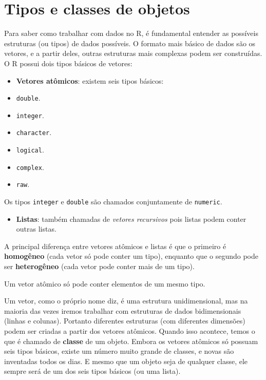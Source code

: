 \documentclass[10pt,a4paper]{book}
\providecommand{\tightlist}{%
  \setlength{\itemsep}{0pt}\setlength{\parskip}{0pt}}
\begin{document}
\section{Tipos e classes de objetos}\label{tipos-e-classes-de-objetos}

Para saber como trabalhar com dados no R, é fundamental entender as
possíveis estruturas (ou tipos) de dados possíveis. O formato mais
básico de dados são os vetores, e a partir deles, outras estruturas mais
complexas podem ser construídas. O R possui dois tipos básicos de
vetores:

\begin{itemize}
\tightlist
\item
  \textbf{Vetores atômicos}: existem seis tipos básicos:
\item
  \texttt{double}.
\item
  \texttt{integer}.
\item
  \texttt{character}.
\item
  \texttt{logical}.
\item
  \texttt{complex}.
\item
  \texttt{raw}.
\end{itemize}

Os tipos \texttt{integer} e \texttt{double} são chamados conjuntamente
de \texttt{numeric}.

\begin{itemize}
\tightlist
\item
  \textbf{Listas}: também chamadas de \emph{vetores recursivos} pois
  listas podem conter outras listas.
\end{itemize}

A principal diferença entre vetores atômicos e listas é que o primeiro é
\textbf{homogêneo} (cada vetor só pode conter um tipo), enquanto que o
segundo pode ser \textbf{heterogêneo} (cada vetor pode conter mais de um
tipo).

Um vetor atômico só pode conter elementos de um mesmo tipo.

Um vetor, como o próprio nome diz, é uma estrutura unidimensional, mas
na maioria das vezes iremos trabalhar com estruturas de dados
bidimensionais (linhas e colunas). Portanto diferentes estruturas (com
diferentes dimensões) podem ser criadas a partir dos vetores atômicos.
Quando isso acontece, temos o que é chamado de \textbf{classe} de um
objeto. Embora os vetores atômicos só possuam seis tipos básicos, existe
um número muito grande de classes, e novas são inventadas todos os dias.
E mesmo que um objeto seja de qualquer classe, ele sempre será de um dos
seis tipos básicos (ou uma lista).
\end{document}

